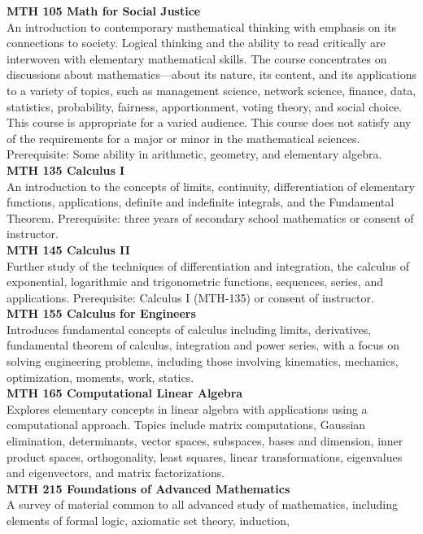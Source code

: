 \documentclass[
  letterpaper,
]{scrbook}
\begin{document}
\textbf{MTH 105 Math for Social Justice}\\
An introduction to contemporary mathematical thinking with emphasis on
its connections to society. Logical thinking and the ability to read
critically are interwoven with elementary mathematical skills. The
course concentrates on discussions about mathematics---about its nature,
its content, and its applications to a variety of topics, such as
management science, network science, finance, data, statistics,
probability, fairness, apportionment, voting theory, and social choice.
This course is appropriate for a varied audience. This course does not
satisfy any of the requirements for a major or minor in the mathematical
sciences. Prerequisite: Some ability in arithmetic, geometry, and
elementary algebra.\\
\textbf{MTH 135 Calculus I}\\
An introduction to the concepts of limits, continuity, differentiation
of elementary functions, applications, definite and indefinite
integrals, and the Fundamental Theorem. Prerequisite: three years of
secondary school mathematics or consent of instructor.\\
\textbf{MTH 145 Calculus II}\\
Further study of the techniques of differentiation and integration, the
calculus of exponential, logarithmic and trigonometric functions,
sequences, series, and applications. Prerequisite: Calculus I (MTH-135)
or consent of instructor.\\
\textbf{MTH 155 Calculus for Engineers}\\
Introduces fundamental concepts of calculus including limits,
derivatives, fundamental theorem of calculus, integration and power
series, with a focus on solving engineering problems, including those
involving kinematics, mechanics, optimization, moments, work, statics.\\
\textbf{MTH 165 Computational Linear Algebra}\\
Explores elementary concepts in linear algebra with applications using a
computational approach. Topics include matrix computations, Gaussian
elimination, determinants, vector spaces, subspaces, bases and
dimension, inner product spaces, orthogonality, least squares, linear
transformations, eigenvalues and eigenvectors, and matrix
factorizations.\\
\textbf{MTH 215 Foundations of Advanced Mathematics}\\
A survey of material common to all advanced study of mathematics,
including elements of formal logic, axiomatic set theory, induction,
\end{document}
